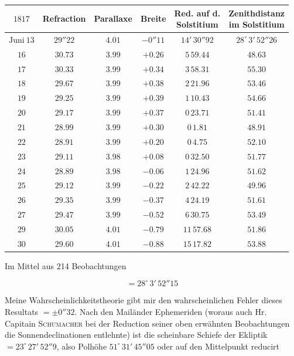 \begin{center}\fontsize{9}{11}\selectfont\setlength{\tabcolsep}{3pt}\begin{tabular}{c|c|c|c|c|c}
$1817$ & Refraction & Parallaxe & Breite & \shortstack{Red. auf d.\\Solstitium} & \shortstack{Zenithdistanz\\im Solstitium}\\
\hline$\text{Juni}\ 13$ & $29''22$ & $4.01$ & $-0''11$ & $14'\,30''92$ & $28^\circ\,3'\,52''26$\\
$16$ & $30.73$ & $3.99$ & $+0.26$ & $5\,59.44$ & $48.63$\\
$17$ & $30.33$ & $3.99$ & $+0.34$ & $3\,58.31$ & $55.30$\\
$18$ & $29.67$ & $3.99$ & $+0.38$ & $2\,21.96$ & $53.46$\\
$19$ & $29.25$ & $3.99$ & $+0.39$ & $1\,10.43$ & $54.66$\\
$20$ & $29.17$ & $3.99$ & $+0.37$ & $0\,23.71$ & $51.41$\\
$21$ & $28.99$ & $3.99$ & $+0.30$ & $0\,1.81$ & $48.91$\\
$22$ & $28.91$ & $3.99$ & $+0.20$ & $0\,4.75$ & $52.10$\\
$23$ & $29.11$ & $3.98$ & $+0.08$ & $0\,32.50$ & $51.77$\\
$24$ & $28.89$ & $3.98$ & $-0.06$ & $1\,24.96$ & $51.62$\\
$25$ & $29.12$ & $3.99$ & $-0.22$ & $2\,42.22$ & $49.96$\\
$26$ & $29.35$ & $3.99$ & $-0.37$ & $4\,24.19$ & $51.61$\\
$27$ & $29.47$ & $3.99$ & $-0.52$ & $6\,30.75$ & $53.49$\\
$29$ & $30.05$ & $4.01$ & $-0.79$ & $11\,57.68$ & $51.86$\\
$30$ & $29.60$ & $4.01$ & $-0.88$ & $15\,17.82$ & $53.88$\\
\end{tabular}\end{center}

\par\indent Im Mittel aus 214 Beobachtungen

\[ = 28^\circ\,3'\,52''15 \]

\par\indent Meine Wahrscheinlichkeitstheorie gibt mir den wahrscheinlichen Fehler dieses Resultats $= \pm 0''32$. Nach den Mailänder Ephemeriden (woraus auch Hr. Capitain \textsc{Schumacher} bei der Reduction seiner oben erwähnten Beobachtungen die Sonnendeclinationen entlehnte) ist die scheinbare Schiefe der Ekliptik $= 23^\circ\,27'\,52''9$, also Polhöhe $51^\circ\,31'\,45''05$ oder auf den Mittelpunkt reducirt

